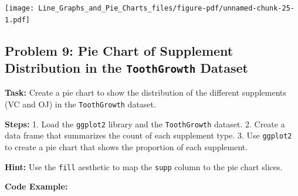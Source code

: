 \documentclass[
  letterpaper,
  DIV=11,
  numbers=noendperiod]{scrreprt}
\newenvironment{Shaded}{\begin{snugshade}}{\end{snugshade}}
\newcommand{\AttributeTok}[1]{\textcolor[rgb]{0.40,0.45,0.13}{#1}}
\newcommand{\CommentTok}[1]{\textcolor[rgb]{0.37,0.37,0.37}{#1}}
\newcommand{\DecValTok}[1]{\textcolor[rgb]{0.68,0.00,0.00}{#1}}
\newcommand{\FunctionTok}[1]{\textcolor[rgb]{0.28,0.35,0.67}{#1}}
\newcommand{\NormalTok}[1]{\textcolor[rgb]{0.00,0.23,0.31}{#1}}
\newcommand{\OtherTok}[1]{\textcolor[rgb]{0.00,0.23,0.31}{#1}}
\newcommand{\SpecialCharTok}[1]{\textcolor[rgb]{0.37,0.37,0.37}{#1}}
\newcommand{\StringTok}[1]{\textcolor[rgb]{0.13,0.47,0.30}{#1}}
\begin{document}
\texttt{[image: Line\_Graphs\_and\_Pie\_Charts\_files/figure-pdf/unnamed-chunk-25-1.pdf]}

\subsection*{\texorpdfstring{Problem 9: Pie Chart of Supplement
Distribution in the \texttt{ToothGrowth}
Dataset}{Problem 9: Pie Chart of Supplement Distribution in the ToothGrowth Dataset}}\label{problem-9-pie-chart-of-supplement-distribution-in-the-toothgrowth-dataset}

\textbf{Task:} Create a pie chart to show the distribution of the
different supplements (VC and OJ) in the \texttt{ToothGrowth} dataset.

\textbf{Steps:} 1. Load the \texttt{ggplot2} library and the
\texttt{ToothGrowth} dataset. 2. Create a data frame that summarizes the
count of each supplement type. 3. Use \texttt{ggplot2} to create a pie
chart that shows the proportion of each supplement.

\textbf{Hint:} Use the \texttt{fill} aesthetic to map the \texttt{supp}
column to the pie chart slices.

\textbf{Code Example:}

\begin{Shaded}
\end{Shaded}
\end{document}
